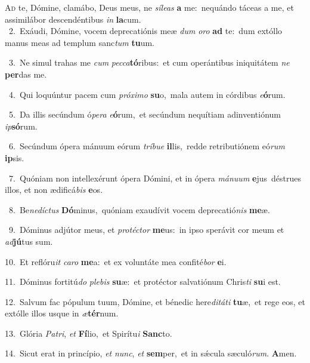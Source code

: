 \lettrine{\initial\textcolor{\initialcolor}{A}}{d} te, Dómine, clamábo, Deus meus, ne \textit{sí}\-\textit{le}\textit{as} \textbf{a} me:~\star nequándo táceas a me, et assimilábor descendéntibus \textit{in} \textbf{la}\-cum.\\
{\numbfont\textcolor{\numbcolor}{~2.}}~Exáudi, Dómine, vocem deprecatiónis meæ \textit{dum} \textit{o}\-\textit{ro} \textbf{ad} te:~\star dum extóllo manus meas ad templum sanc\textit{tum} \textbf{tu}\-um.\par
{\numbfont\textcolor{\numbcolor}{~3.}}~Ne simul trahas me \textit{cum} \textit{pec}\-\textit{ca}\textbf{tó}ribus:~\star et cum operántibus iniquitátem \textit{ne} \textbf{per}\-das me.\par
{\numbfont\textcolor{\numbcolor}{~4.}}~Qui loquúntur pacem cum \textit{pró}\-\textit{xi}\textit{mo} \textbf{su}\-o,~\star mala autem in córdibus \textit{e}\-\textbf{ó}rum.\par
{\numbfont\textcolor{\numbcolor}{~5.}}~Da illis secúndum ó\-\textit{pe}\-\textit{ra} \textit{e}\-\textbf{ó}rum,~\star et secúndum nequítiam adinventiónum \textit{ip}\-\textbf{só}rum.\par
{\numbfont\textcolor{\numbcolor}{~6.}}~Secúndum ópera mánuum eórum \textit{trí}\-\textit{bu}\textit{e} \textbf{il}\-lis,~\star redde retributiónem eó\textit{rum} \textbf{ip}\-sis.\par
{\numbfont\textcolor{\numbcolor}{~7.}}~Quóniam non intellexérunt ópera Dómini, et in ópera \textit{má}\-\textit{nu}\textit{um} \textbf{e}\-jus~\star déstrues illos, et non ædificá\textit{bis} \textbf{e}\-os.\par
{\numbfont\textcolor{\numbcolor}{~8.}}~Be\-\textit{ne}\-\textit{díc}\textit{tus} \textbf{Dó}\-minus,~\star quóniam exaudívit vocem deprecatió\textit{nis} \textbf{me}\-æ.\par
{\numbfont\textcolor{\numbcolor}{~9.}}~Dóminus adjútor meus, et \textit{pro}\-\textit{téc}\textit{tor} \textbf{me}\-us:~\star in ipso sperávit cor meum et \textit{ad}\-\textbf{jú}tus sum.\par
{\numbfont\textcolor{\numbcolor}{10.}}~Et reflóru\textit{it} \textit{ca}\-\textit{ro} \textbf{me}\-a:~\star et ex voluntáte mea confité\textit{bor} \textbf{e}\-i.\par
{\numbfont\textcolor{\numbcolor}{11.}}~Dóminus fortitú\textit{do} \textit{ple}\-\textit{bis} \textbf{su}\-æ:~\star et protéctor salvatiónum Chris\textit{ti} \textbf{su}\-i est.\par
{\numbfont\textcolor{\numbcolor}{12.}}~Salvum fac pópulum tuum, Dómine, et bénedic here\-\textit{di}\-\textit{tá}\textit{ti} \textbf{tu}\-æ,~\star et rege eos, et extólle illos usque in \textit{æ}\-\textbf{tér}num.\par
{\numbfont\textcolor{\numbcolor}{13.}}~Glória \textit{Pa}\-\textit{tri}, \textit{et} \textbf{Fí}\-lio,~\star et Spirítu\textit{i} \textbf{Sanc}\-to.\par
{\numbfont\textcolor{\numbcolor}{14.}}~Sicut erat in princípio, \textit{et} \textit{nunc}\-, \textit{et} \textbf{sem}\-per,~\star et in sǽcula sæculó\-\textit{rum}\-. \textbf{A}\-men.\par
